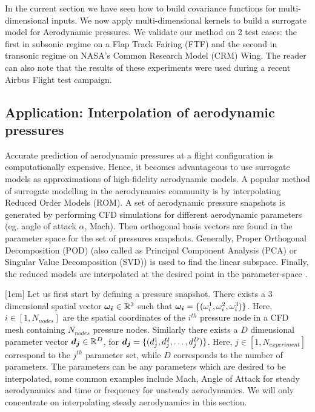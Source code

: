In the current section we have seen how to build covariance functions for multi-dimensional inputs. We now apply multi-dimensional kernels to build a surrogate model for Aerodynamic pressures. We validate our method on 2 test cases: the first in subsonic regime on a Flap Track Fairing (FTF) and the second in transonic regime on NASA's Common Research Model (CRM) Wing. The reader can also note that the results of these experiments were used during a recent Airbus Flight test campaign.

\subsection{Application: Interpolation of aerodynamic pressures}\label{subecInterpolationOfAerodynamicPressures}
Accurate prediction of aerodynamic pressures at a flight configuration is computationally expensive. Hence, it becomes advantageous to use surrogate models as approximations of high-fidelity aerodynamic models. A popular method of surrogate modelling in the aerodynamics community is by interpolating Reduced Order Models (ROM). A set of aerodynamic pressure snapshots is generated by performing CFD simulations for different aerodynamic parameters (eg. angle of attack $\alpha$, Mach). Then orthogonal basis vectors are found in the parameter space for the set of pressures snapshots. Generally, Proper Orthogonal Decomposition (POD) \cite{tan2003proper, rosenbaum2013efficient, braconnier2011towards} (also called as Principal Component Analysis (PCA) or Singular Value Decomposition (SVD)) is used to find the linear subspace. Finally, the reduced models are interpolated at the desired point in the parameter-space \cite{beckert2001multivariate, barrault2004empirical}. 

[1cm]
Let us first start by defining a pressure snapshot. There exists a \(3\) dimensional spatial vector \(\boldsymbol{\omega_{i}} \in  \mathbb{R}^{3}\) such that \(\boldsymbol{\omega_{i}} = \{(\omega_{i}^{1}, \omega_{i}^{2}, \omega_{i}^{3})\}\). Here, \(i \in [1,N_{nodes}] \) are the spatial coordinates of the \(i^{th}\) pressure node in a CFD mesh containing \(N_{nodes}\) pressure nodes. Similarly there exists a \(D\) dimensional parameter vector \(\boldsymbol{d_{j}} \in  \mathbb{R}^{D}\), for \(\boldsymbol{d_{j}} = \{(d_{j}^{1}, d_{j}^{2}, \ldots ,d_{j}^{D})\}\). Here,   \(j \in [1,N_{experiment}] \) correspond to the \(j^{th}\) parameter set, while $D$ corresponds to the number of parameters. The parameters can be any parameters which are desired to be interpolated, some common examples include Mach, Angle of Attack for steady aerodynamics and time or frequency for unsteady aerodynamics. We will only concentrate on interpolating steady aerodynamics in this section.


